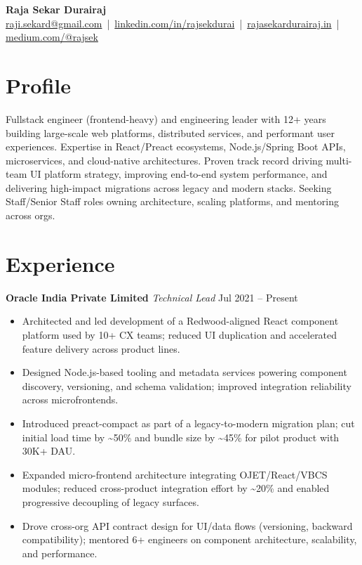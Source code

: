 \documentclass[a4paper,10pt]{article}
\begin{document}
{\LARGE \bf Raja Sekar Durairaj} \\
\href{mailto:raji.sekard@gmail.com}{raji.sekard@gmail.com} \,|\, 
\href{https://www.linkedin.com/in/rajsekdurai}{linkedin.com/in/rajsekdurai} \,|\, 
\href{https://www.rajasekardurairaj.in}{rajasekardurairaj.in} \,|\, 
\href{https://medium.com/@rajsek}{medium.com/@rajsek}

\section{Profile}
Fullstack engineer (frontend-heavy) and engineering leader with 12+ years building large-scale web platforms, distributed services, and performant user experiences. Expertise in React/Preact ecosystems, Node.js/Spring Boot APIs, microservices, and cloud-native architectures. Proven track record driving multi-team UI platform strategy, improving end-to-end system performance, and delivering high-impact migrations across legacy and modern stacks. Seeking Staff/Senior Staff roles owning architecture, scaling platforms, and mentoring across orgs.

\section{Experience}

\textbf{Oracle India Private Limited} \hfill \textit{Technical Lead} \hfill Jul 2021 -- Present
\begin{itemize}
  \item Architected and led development of a Redwood-aligned React component platform used by 10+ CX teams; reduced UI duplication and accelerated feature delivery across product lines.
  \item Designed Node.js-based tooling and metadata services powering component discovery, versioning, and schema validation; improved integration reliability across microfrontends.
  \item Introduced preact-compact as part of a legacy-to-modern migration plan; cut initial load time by \textasciitilde50\% and bundle size by \textasciitilde45\% for pilot product with 30K+ DAU.
  \item Expanded micro-frontend architecture integrating OJET/React/VBCS modules; reduced cross-product integration effort by \textasciitilde20\% and enabled progressive decoupling of legacy surfaces.
  \item Drove cross-org API contract design for UI/data flows (versioning, backward compatibility); mentored 6+ engineers on component architecture, scalability, and performance.
\end{itemize}
\end{document}
